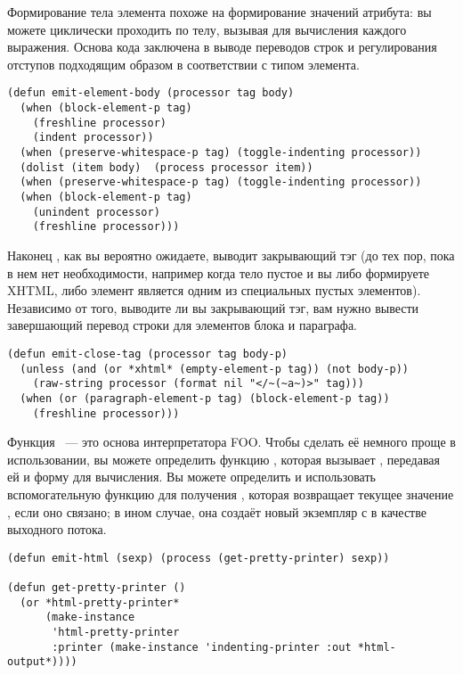 Формирование тела элемента похоже на формирование значений атрибута: вы можете циклически
проходить по телу, вызывая  для вычисления каждого выражения. Основа кода
заключена в выводе переводов строк и регулирования отступов подходящим образом в
соответствии с типом элемента.

\begin{lstlisting}
(defun emit-element-body (processor tag body)
  (when (block-element-p tag)
    (freshline processor)
    (indent processor))
  (when (preserve-whitespace-p tag) (toggle-indenting processor))
  (dolist (item body)  (process processor item))
  (when (preserve-whitespace-p tag) (toggle-indenting processor))
  (when (block-element-p tag)
    (unindent processor)
    (freshline processor)))
\end{lstlisting}

Наконец , как вы вероятно ожидаете, выводит закрывающий тэг (до тех
пор, пока в нем нет необходимости, например когда тело пустое и вы либо формируете XHTML,
либо элемент является одним из специальных пустых элементов). Независимо от того, выводите
ли вы закрывающий тэг, вам нужно вывести завершающий перевод строки для элементов блока и
параграфа.

\begin{lstlisting}
(defun emit-close-tag (processor tag body-p)
  (unless (and (or *xhtml* (empty-element-p tag)) (not body-p))
    (raw-string processor (format nil "</~(~a~)>" tag)))
  (when (or (paragraph-element-p tag) (block-element-p tag))
    (freshline processor)))
\end{lstlisting}

Функция ~--- это основа интерпретатора FOO. Чтобы сделать её немного проще в
использовании, вы можете определить функцию , которая вызывает
, передавая ей  и форму для вычисления. Вы можете
определить и использовать вспомогательную функцию  для получения
, которая возвращает текущее значение ,
если оно связано; в ином случае, она создаёт новый экземпляр  с
 в качестве выходного потока.

\begin{lstlisting}
(defun emit-html (sexp) (process (get-pretty-printer) sexp))

(defun get-pretty-printer ()
  (or *html-pretty-printer*
      (make-instance 
       'html-pretty-printer
       :printer (make-instance 'indenting-printer :out *html-output*))))
\end{lstlisting}

